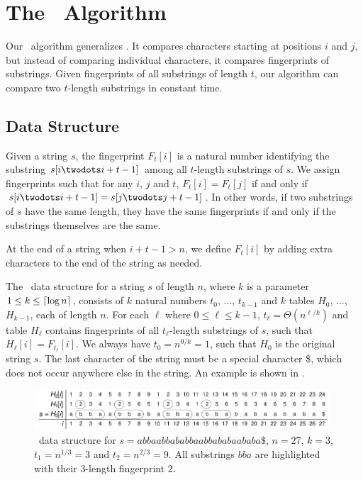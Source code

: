 \documentclass[a4]{article}
\newcommand*{\pref}{\prettyref}
\begin{document}
\section{The \fprintk\ Algorithm\label{sec:fprintk}}

Our \fprintk\ algorithm generalizes . It compares characters starting at positions $i$ and $j$, but instead of comparing individual characters, it compares fingerprints of substrings. Given fingerprints of all substrings of length $t$, our algorithm can compare two $t$-length substrings in constant time.

\subsection{Data Structure\label{sec:fingerprint-ds}}

Given a string $s$, the fingerprint $F_t[i]$ is a natural number identifying the substring $s[i\twodots i+t-1]$ among all $t$-length substrings of $s$. We assign fingerprints such that for any $i$, $j$ and $t$, $F_t[i] = F_t[j]$ if and only if $s[i\twodots i+t-1] = s[j\twodots j+t-1]$. In other words, if two substrings of $s$ have the same length, they have the same fingerprints if and only if the substrings themselves are the same.

At the end of a string when $i+t-1>n$, we define $F_t[i]$ by adding extra characters to the end of the string as needed.

The \fprintk\ data structure for a string $s$ of length $n$, where $k$ is a parameter $1 \leq k \leq \lceil\log n\rceil$, consists of $k$ natural numbers $t_0$, ..., $t_{k-1}$ and $k$ tables $H_0$, ..., $H_{k-1}$, each of length $n$. For each $\ell$ where $0\leq \ell\leq k-1$, $t_\ell = \Theta(n^{\ell/k})$ and table $H_\ell$ contains fingerprints of all $t_\ell$-length substrings of $s$, such that $H_\ell[i] = F_{t_\ell}[i]$. We always have $t_0 = n^{0/k} = 1$, such that $H_0$ is the original string $s$. The last character of the string must be a special character \$, which does not occur anywhere else in the string. An example is shown in \pref{fig:fingerprint-ds}.

\begin{figure}[tp]
    \begin{center}
        \includegraphics[width=0.98\textwidth,page=1]{../doc/fingerprint.pdf}
    \end{center}
    \caption{\label{fig:fingerprint-ds}\fprintk\ data structure for $s=\textit{abbaabbababbaabbababaababa\$}$, $n=27$, $k=3$, $t_1=n^{1/3}=3$ and $t_2=n^{2/3}=9$. All substrings $\textit{bba}$ are highlighted with their $3$-length fingerprint $2$.}
\end{figure}
\end{document}
